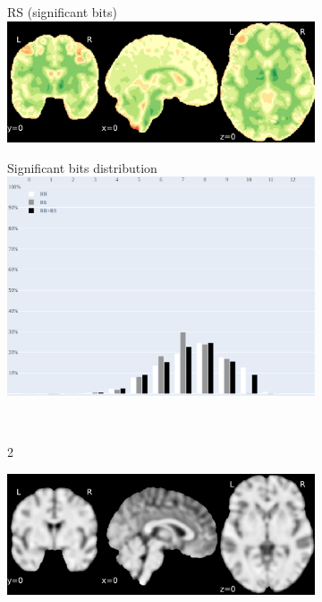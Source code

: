 \documentclass{article}
\begin{document}
\begin{landscape}
\begin{figure}
\begin{subfigure}[t]{0.16\paperheight}
        \end{subfigure}
        \begin{subfigure}[t]{0.16\paperheight}
            \centering
            RS (significant bits)
            \includegraphics[width=\textwidth]{figures/sig/fwhm_5/rs_ds001600_sub-1_sig.pdf}
        \end{subfigure}
        \begin{subfigure}[t]{0.16\paperheight}
            \centering
            Significant bits distribution
            \includegraphics[width=\textwidth]{figures/sig/fwhm_5/dist_ds001600_sub-1.pdf}
        \end{subfigure} \\
        \begin{subfigure}[b][][c]{0.01\paperwidth} 2 \vspace*{15pt} \end{subfigure}
        \begin{subfigure}[t]{0.2\paperheight}
            \centering
            \includegraphics[width=\textwidth]{figures/ieee_T1/fwhm_5/ieee_ds001771_sub-36.pdf}

\end{subfigure}
\end{figure}
\end{landscape}
\end{document}

